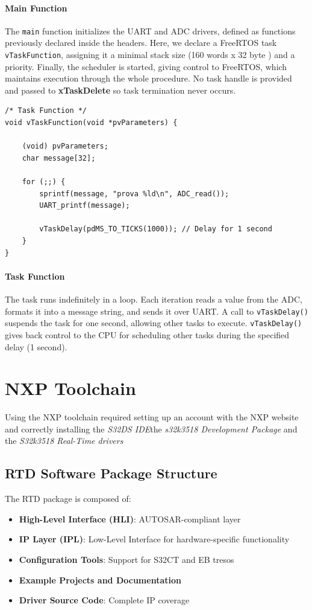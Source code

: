 \documentclass{article}
\begin{document}
\paragraph{Main Function}  
The \texttt{main} function initializes the UART and ADC drivers, defined as functions previously declared inside the headers. Here, we declare a FreeRTOS task \texttt{vTaskFunction}, assigning it a minimal stack size (160 words x 32 byte ) and a priority.  
Finally, the scheduler is started, giving control to FreeRTOS, which maintains execution through the whole procedure. No task handle is provided and passed to \textbf{xTaskDelete} so task termination never occurs.


\begin{verbatim}
/* Task Function */
void vTaskFunction(void *pvParameters) {

    (void) pvParameters;
    char message[32];

    for (;;) {
        sprintf(message, "prova %ld\n", ADC_read());
        UART_printf(message);

        vTaskDelay(pdMS_TO_TICKS(1000)); // Delay for 1 second
    }
}
\end{verbatim}

\paragraph{Task Function}  
The task runs indefinitely in a loop.  
Each iteration reads a value from the ADC, formats it into a message string, and sends it over UART.  
A call to \texttt{vTaskDelay()} suspends the task for one second, allowing other tasks to execute.  
\texttt{vTaskDelay()} gives back control to the CPU for scheduling other tasks during the specified delay (1 second).
\newpage
\section{NXP Toolchain}
Using the NXP toolchain required setting up an account with the NXP website and correctly installing the \textit{S32DS IDE}the \textit{s32k3518 Development Package} and the \textit{S32k3518 Real-Time drivers} \cite{NXP_RTD_Guide}

\subsection{RTD Software Package Structure}
The RTD package is composed of:
\begin{itemize}
    \item \textbf{High-Level Interface (HLI)}: AUTOSAR-compliant layer
    \item \textbf{IP Layer (IPL)}: Low-Level Interface for hardware-specific functionality
    \item \textbf{Configuration Tools}: Support for S32CT and EB tresos
    \item \textbf{Example Projects and Documentation}
    \item \textbf{Driver Source Code}: Complete IP coverage
\end{itemize}
\end{document}

